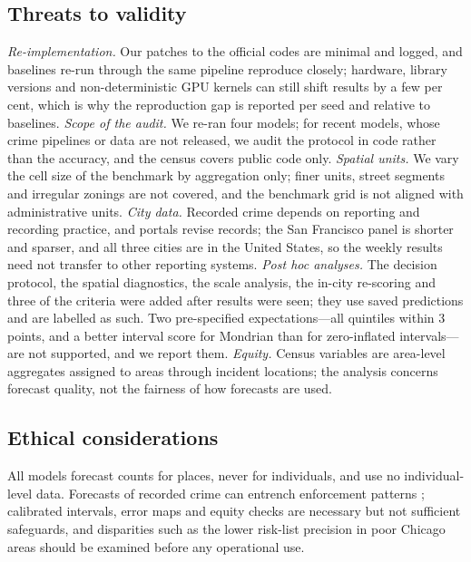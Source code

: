 \documentclass[preprint,12pt,authoryear]{elsarticle}
\begin{document}
\subsection{Threats to validity}
\emph{Re-implementation.} Our patches to the official codes are minimal and logged, and baselines re-run through the same pipeline reproduce closely; hardware, library versions and non-deterministic GPU kernels can still shift results by a few per cent, which is why the reproduction gap is reported per seed and relative to baselines. \emph{Scope of the audit.} We re-ran four models; for recent models, whose crime pipelines or data are not released, we audit the protocol in code rather than the accuracy, and the census covers public code only. \emph{Spatial units.} We vary the cell size of the benchmark by aggregation only; finer units, street segments \citep{rosser2017predictive} and irregular zonings are not covered, and the benchmark grid is not aligned with administrative units. \emph{City data.} Recorded crime depends on reporting and recording practice, and portals revise records; the San Francisco panel is shorter and sparser, and all three cities are in the United States, so the weekly results need not transfer to other reporting systems. \emph{Post hoc analyses.} The decision protocol, the spatial diagnostics, the scale analysis, the in-city re-scoring and three of the criteria were added after results were seen; they use saved predictions and are labelled as such. Two pre-specified expectations---all quintiles within 3 points, and a better interval score for Mondrian than for zero-inflated intervals---are not supported, and we report them. \emph{Equity.} Census variables are area-level aggregates assigned to areas through incident locations; the analysis concerns forecast quality, not the fairness of how forecasts are used.

\subsection{Ethical considerations}
All models forecast counts for places, never for individuals, and use no individual-level data. Forecasts of recorded crime can entrench enforcement patterns \citep{lum2016predict,ensign2018runaway,richardson2019dirty}; calibrated intervals, error maps and equity checks are necessary but not sufficient safeguards, and disparities such as the lower risk-list precision in poor Chicago areas should be examined before any operational use.

\end{document}
